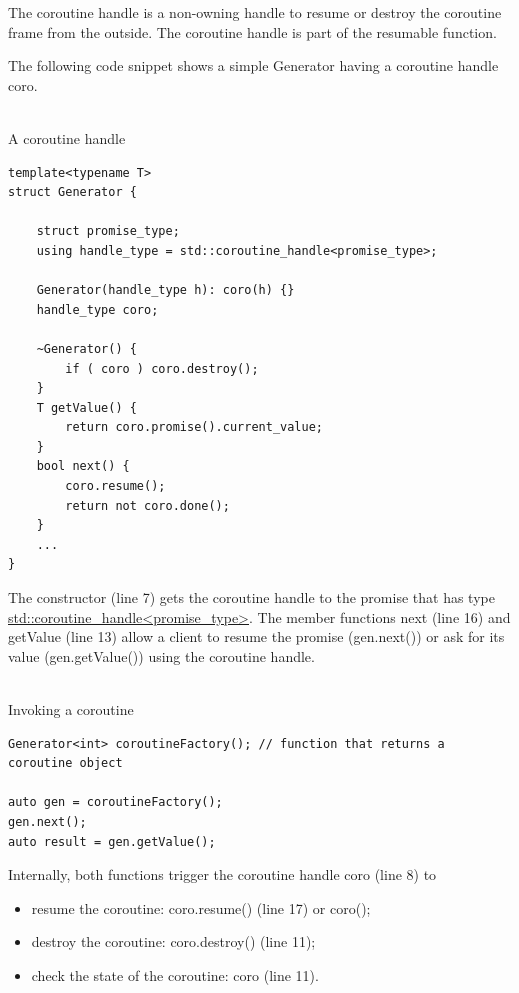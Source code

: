 The coroutine handle is a non-owning handle to resume or destroy the coroutine frame from the outside. The coroutine handle is part of the resumable function.

The following code snippet shows a simple Generator having a coroutine handle coro.

\hspace*{\fill} \\ %
\noindent
A coroutine handle
\begin{lstlisting}[style=styleCXX]
template<typename T>
struct Generator {

	struct promise_type;
	using handle_type = std::coroutine_handle<promise_type>;
	
	Generator(handle_type h): coro(h) {}
	handle_type coro;
	
	~Generator() {
		if ( coro ) coro.destroy();
	}
	T getValue() {
		return coro.promise().current_value;
	}
	bool next() {
		coro.resume();
		return not coro.done();
	}
	...
}
\end{lstlisting}

The constructor (line 7) gets the coroutine handle to the promise that has type \href{https://en.cppreference.com/w/cpp/coroutine/coroutine_handle}{std::coroutine\_handle<promise\_type>}. The member functions next (line 16) and getValue (line 13) allow a client to resume the promise (gen.next()) or ask for its value (gen.getValue()) using the coroutine handle.

\hspace*{\fill} \\ %
\noindent
Invoking a coroutine
\begin{lstlisting}[style=styleCXX]
Generator<int> coroutineFactory(); // function that returns a coroutine object

auto gen = coroutineFactory();
gen.next();
auto result = gen.getValue();
\end{lstlisting}

Internally, both functions trigger the coroutine handle coro (line 8) to

\begin{itemize}
\item 
resume the coroutine: coro.resume() (line 17) or coro();

\item 
destroy the coroutine: coro.destroy() (line 11);

\item 
check the state of the coroutine: coro (line 11).
\end{itemize}

